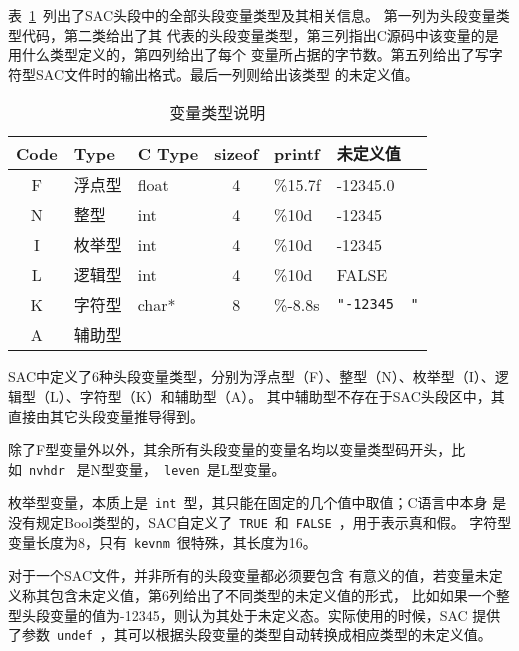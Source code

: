 表~\ref{table:header-variables-type}~列出了SAC头段中的全部头段变量类型及其相关信息。
第一列为头段变量类型代码，第二类给出了其
代表的头段变量类型，第三列指出C源码中该变量的是用什么类型定义的，第四列给出了每个
变量所占据的字节数。第五列给出了写字符型SAC文件时的输出格式。最后一列则给出该类型
的未定义值。

\begin{table}[H]
\caption{变量类型说明}
\label{table:header-variables-type}
\centering
\ttfamily
\small
\begin{tabular}{cllcll}
	\toprule
    Code    &	Type        &   C Type & sizeof &   printf	&   未定义值        \\
	\midrule
    F		&	浮点型		&   float  &  4     &	\%15.7f &   -12345.0        \\
    N		&	整型		&   int    &  4     &	\%10d   &   -12345        \\
    I		&	枚举型		&   int    &  4     &	\%10d   &   -12345	        \\
    L		&	逻辑型		&   int    &  4     &	\%10d   &   FALSE        \\
    K		&	字符型		&   char*  &  8     &	\%-8.8s & \lstinline[showspaces=true]{"-12345  "}     \\
    A		&	辅助型		&          &        &			& 	    \\
	\bottomrule
\end{tabular}
\end{table}

SAC中定义了6种头段变量类型，分别为浮点型（F）、整型（N）、枚举型（I）、逻辑型（L）、字符型（K）和辅助型（A）。
其中辅助型不存在于SAC头段区中，其直接由其它头段变量推导得到。

除了F型变量外以外，其余所有头段变量的变量名均以变量类型码开头，比如~\lstinline{nvhdr}~
是N型变量，~\lstinline{leven}~是L型变量。

枚举型变量，本质上是~\lstinline{int}~型，其只能在固定的几个值中取值；C语言中本身
是没有规定Bool类型的，SAC自定义了~\lstinline{TRUE}~和~\lstinline{FALSE}~，用于表示真和假。
字符型变量长度为8，只有~\lstinline{kevnm}~很特殊，其长度为16。

对于一个SAC文件，并非所有的头段变量都必须要包含
有意义的值，若变量未定义称其包含未定义值，第6列给出了不同类型的未定义值的形式，
比如如果一个整型头段变量的值为-12345，则认为其处于未定义态。实际使用的时候，SAC
提供了参数~\lstinline{undef}~，其可以根据头段变量的类型自动转换成相应类型的未定义值。
